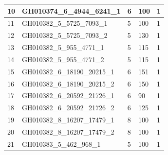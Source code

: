 \begin{table}[]
\begin{tabular}{|l|l|l|l|l|}
		10          & GH010374\_6\_4944\_6241\_1   & 6             & 100                                                         & 1                                                     \\ \hline
		11          & GH010382\_5\_5725\_7093\_1   & 5             & 100                                                         & 1                                                     \\ \hline
		12          & GH010382\_5\_5725\_7093\_2   & 5             & 130                                                         & 1                                                     \\ \hline
		13          & GH010382\_5\_955\_4771\_1    & 5             & 115                                                         & 1                                                     \\ \hline
		14          & GH010382\_5\_955\_4771\_2    & 5             & 115                                                         & 1                                                     \\ \hline
		15          & GH010382\_6\_18190\_20215\_1 & 6             & 151                                                         & 1                                                     \\ \hline
		16          & GH010382\_6\_18190\_20215\_2 & 6             & 150                                                         & 1                                                     \\ \hline
		17          & GH010382\_6\_20592\_21726\_1 & 6             & 90                                                          & 1                                                     \\ \hline
		18          & GH010382\_6\_20592\_21726\_2 & 6             & 125                                                         & 1                                                     \\ \hline
		19          & GH010382\_8\_16207\_17479\_1 & 8             & 100                                                         & 1                                                     \\ \hline
		20          & GH010382\_8\_16207\_17479\_2 & 8             & 100                                                         & 1                                                     \\ \hline
		21          & GH010383\_5\_462\_968\_1     & 5             & 100                                                         & 1                                                     \\ \hline

\end{tabular}
\end{table}
